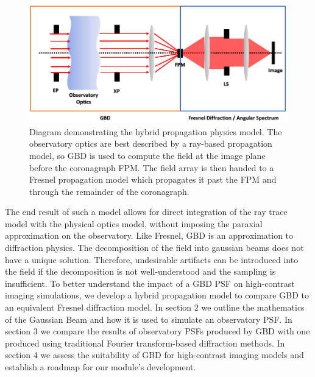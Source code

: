 \begin{figure}[H]
    \centering
    \includegraphics[width=\textwidth]{hybridpropdiagram.png}
    \caption{Diagram demonstrating the hybrid propagation physics model. The observatory optics are best described by a ray-based propagation model, so GBD is used to compute the field at the image plane before the coronagraph FPM. The field array is then handed to a Fresnel propagation model which propagates it past the FPM and through the remainder of the coronagraph.}
    \label{fig:hybridpropdiagram}
\end{figure}

The end result of such a model allows for direct integration of the ray trace model with the physical optics model, without imposing the paraxial approximation on the observatory. Like Fresnel, GBD is an approximation to diffraction physics. The decomposition of the field into gaussian beams does not have a unique solution. Therefore, undesirable artifacts can be introduced into the field if the decomposition is not well-understood and the sampling is insufficient\cite{Ashcraft2020}. To better understand the impact of a GBD PSF on high-contrast imaging simulations, we develop a hybrid propagation model to compare GBD to an equivalent Fresnel diffraction model.  In section 2 we outline the mathematics of the Gaussian Beam and how it is used to simulate an observatory PSF. In section 3 we compare the results of observatory PSFs produced by GBD with one produced using traditional Fourier transform-based diffraction methods. In section 4 we assess the suitability of GBD for high-contrast imaging models and establish a roadmap for our module's development.

